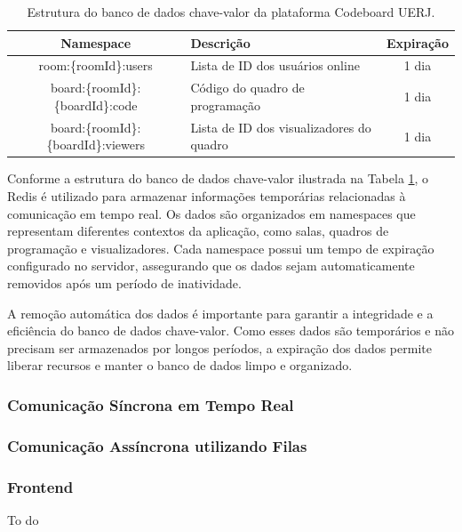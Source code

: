 \begin{table}[H]
    \centering
    \begin{tabular}{|c|p{6cm}|c|}
        \hline
        \textbf{Namespace}                   & \textbf{Descrição}                       & \textbf{Expiração} \\
        \hline
        room:\{roomId\}:users                & Lista de ID dos usuários online          & 1 dia              \\
        \hline
        board:\{roomId\}:\{boardId\}:code    & Código do quadro de programação          & 1 dia              \\
        \hline
        board:\{roomId\}:\{boardId\}:viewers & Lista de ID dos visualizadores do quadro & 1 dia              \\ 
        
        \hline
    \end{tabular}
    \caption{Estrutura do banco de dados chave-valor da plataforma Codeboard UERJ.}
    \label{tab:key-value-database}
\end{table}

Conforme a estrutura do banco de dados chave-valor ilustrada na Tabela \ref{tab:key-value-database}, o Redis é utilizado para armazenar informações temporárias relacionadas à comunicação em tempo real. Os dados são organizados em namespaces que representam diferentes contextos da aplicação, como salas, quadros de programação e visualizadores. Cada namespace possui um tempo de expiração configurado no servidor, assegurando que os dados sejam automaticamente removidos após um período de inatividade.

A remoção automática dos dados é importante para garantir a integridade e a eficiência do banco de dados chave-valor. Como esses dados são temporários e não precisam ser armazenados por longos períodos, a expiração dos dados permite liberar recursos e manter o banco de dados limpo e organizado.

\subsubsection{Comunicação Síncrona em Tempo Real}


\subsubsection{Comunicação Assíncrona utilizando Filas}



\subsubsection{Frontend}

To do
